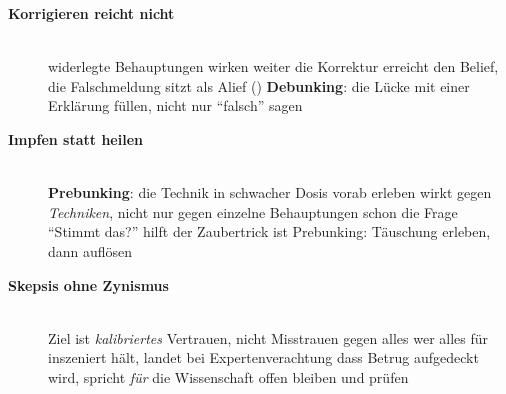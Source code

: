 \begin{description}
\item[{\rot\bf Korrigieren reicht nicht}]~\\[-\lblskip]
\bi
  \ite widerlegte Behauptungen wirken weiter
    \parencite{lewandowsky2012misinformation}
  \ite die Korrektur erreicht den Belief, die Falschmeldung sitzt als Alief
    ()
  \ite \textbf{Debunking}: die Lücke mit einer Erklärung füllen, nicht nur
    \enquote{falsch} sagen \parencite{lewandowsky2020debunking}
\ei
\os{\newpage}

\item[{\rot\bf Impfen statt heilen}]~\\[-\lblskip]
\bi
  \ite \textbf{Prebunking}: die Technik in schwacher Dosis vorab erleben
    \parencite{mcguire1964inoculation}
  \ite wirkt gegen \emph{Techniken}, nicht nur gegen einzelne Behauptungen
    \parencite{roozenbeek2022inoculation}
  \ite schon die Frage \enquote{Stimmt das?} hilft
    \parencite{pennycook2021accuracy}
  \ite der Zaubertrick ist Prebunking: Täuschung erleben, dann auflösen
\ei
\os{\newpage}

\item[{\rot\bf Skepsis ohne Zynismus}]~\\[-\lblskip]
\bi
  \ite Ziel ist \emph{kalibriertes} Vertrauen, nicht Misstrauen gegen alles
  \ite wer alles für inszeniert hält, landet bei Expertenverachtung
    \parencite{mede2020populism}
  \ite dass Betrug aufgedeckt wird, spricht \emph{für} die Wissenschaft
  \ite offen bleiben und prüfen \parencite{sagan1995demon}
\ei
{}
\os{\newpage}
\end{description}

